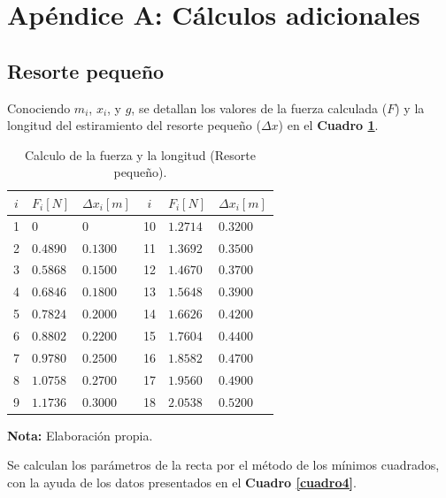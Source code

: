 \documentclass[letter,11pt]{article}
\newcommand{\source}[1]{\vspace{-11pt} \caption*{\small{\textbf{Nota:} {#1}}}}
\begin{document}
\newpage
\section*{Apéndice A: Cálculos adicionales}

\subsection{Resorte pequeño}

Conociendo $m_i$, $x_i$, y $g$, se detallan los valores de la fuerza calculada
($F$) y la longitud del estiramiento del resorte pequeño ($\Delta x$) en el
\textbf{Cuadro \ref{cuadro3}}.

\begin{table}[!h]
\begin{center}
\begin{tabular}{|c||>{\centering}m{2.0cm}<{\centering}
                  |>{\centering}m{2.0cm}<{\centering}|
                |c||>{\centering}m{2.0cm}<{\centering}
                  |>{\centering}m{2.0cm}<{\centering}|}
\hline
$i$ & $F_i [N]$ & $\Delta x_i [m]$ & $i$ & $F_i [N]$ & $\Delta x_i [m]$
    \tabularnewline \hline \hline
 1 & $     0$ & $     0$ & 10 & $1.2714$ & $0.3200$\tabularnewline \hline
 2 & $0.4890$ & $0.1300$ & 11 & $1.3692$ & $0.3500$\tabularnewline \hline
 3 & $0.5868$ & $0.1500$ & 12 & $1.4670$ & $0.3700$\tabularnewline \hline
 4 & $0.6846$ & $0.1800$ & 13 & $1.5648$ & $0.3900$\tabularnewline \hline
 5 & $0.7824$ & $0.2000$ & 14 & $1.6626$ & $0.4200$\tabularnewline \hline
 6 & $0.8802$ & $0.2200$ & 15 & $1.7604$ & $0.4400$\tabularnewline \hline
 7 & $0.9780$ & $0.2500$ & 16 & $1.8582$ & $0.4700$\tabularnewline \hline
 8 & $1.0758$ & $0.2700$ & 17 & $1.9560$ & $0.4900$\tabularnewline \hline
 9 & $1.1736$ & $0.3000$ & 18 & $2.0538$ & $0.5200$\tabularnewline \hline
\end{tabular}
\caption{Calculo de la fuerza y la longitud (Resorte pequeño).}
\label{cuadro3}
\source{Elaboración propia.}
\end{center}
\end{table}

Se calculan los parámetros de la recta por el método de los mínimos cuadrados,
con la ayuda de los datos presentados en el \textbf{Cuadro \ref{cuadro4}}.
\end{document}
